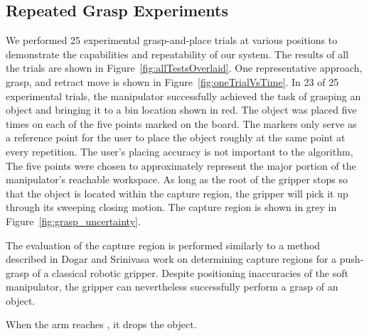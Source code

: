\subsection{Repeated Grasp Experiments}
We performed 25 experimental grasp-and-place trials at various positions to demonstrate the capabilities and repeatability of our system.
The results of all the trials are shown in Figure~\ref{fig:allTestsOverlaid}.
One representative approach, grasp, and retract move is shown in Figure~\ref{fig:oneTrialVsTime}.
In 23 of 25 experimental trials, the manipulator successfully achieved the task of grasping an object and bringing it to a bin location shown in red.
The object was placed five times on each of the five points marked on the board.
The markers only serve as a reference point for the user to place the object roughly at the same point at every repetition.
The user's placing accuracy is not important to the algorithm, 
The five points were chosen to approximately represent the major portion of the manipulator's reachable workspace.
As long as the root of the gripper stops so that the object is located within the capture region, the gripper will pick it up through its sweeping closing motion. The capture region is shown in grey in Figure~\ref{fig:grasp_uncertainty}. 

The evaluation of the capture region is performed similarly to a method described in Dogar and Srinivasa\cite{dogar2010push} work on determining capture regions for a push-grasp of a classical robotic gripper.
Despite positioning inaccuracies of the soft manipulator, the gripper can nevertheless successfully perform a grasp of an object. 

When the arm reaches , it drops the object.

